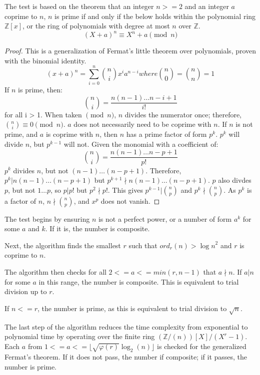 \documentclass{article}
\begin{document}
The test is based on the theorem that an integer $n >= 2$ and an integer $a$ coprime to $n$, $n$ is prime if and only if the below holds within the polynomial ring $\mathbb{Z}[x]$, or the ring of polynomials with degree at most $n$ over $\mathbb{Z}$.
\[
    (X + a)^n \equiv X^n + a \pmod{n}
\]

\begin{proof} %
    This is a generalization of Fermat's little theorem over polynomials, proven with the binomial identity.
    \[
        (x + a)^n = \sum_{i=0}^{n} \binom{n}{i} x^i a^{n - i} where \binom{n}{0} = \binom{n}{n} = 1
    \]
    If $n$ is prime, then:
    \[
        \binom{n}{i} = \frac{n (n - 1) \ldots{} {n - i + 1}}{i!}
    \]
    for all i > 1. When taken $\pmod{n}$, $n$ divides the numerator once; therefore, $\binom{n}{i} \equiv 0 \pmod{n}$. $a$ does not necessarily need to be coprime with $n$.
    If $n$ is not prime, and $a$ is coprime with $n$, then $n$ has a prime factor of form $p^k$. $p^k$ will divide $n$, but $p^{k - 1}$ will not. Given the monomial with a coefficient of:
    \[
        \binom{n}{i} = \frac{n (n - 1) \ldots{} {n - p + 1}}{p!}
    \]
    $p^k$ divides $n$, but not $(n - 1) \ldots{} (n - p + 1)$. Therefore, $p^k \vert n (n - 1) \ldots{} (n - p + 1)$ but $p^{k + 1} \nmid n (n - 1) \ldots{} (n - p + 1)$. $p$ also divdes $p$, but not $1 \ldots p$, so $p \vert p!$ but $p^2 \nmid p!$. This gives $p^{k - 1} \vert \binom{n}{p}$ and $p^k \nmid \binom{n}{p}$. As $p^k$ is a factor of $n$, $n \nmid \binom{n}{p}$, and $x^p$ does not vanish.
\end{proof}

The test begins by ensuring $n$ is not a perfect power, or a number of form $a^k$ for some $a$ and $k$. If it is, the number is composite.

Next, the algorithm finds the smallest $r$ such that $ord_r(n) > {\log{n}}^2$ and $r$ is coprime to $n$.

The algorithm then checks for all $2 <= a <= min(r, n - 1)$ that $a \nmid n$. If $a \vert n$ for some $a$ in this range, the number is composite. This is equivalent to trial division up to $r$.

If $n <= r$, the number is prime, as this is equivalent to trial division to $\sqrt{n}$.

The last step of the algorithm reduces the time complexity from exponential to polynomial time by operating over the finite ring $(\mathbb{Z}/(n))[X] / (X^r - 1)$. Each $a$ from $1 <= a <= \lfloor \sqrt{\varphi(r)}\log_2(n) \rfloor$ is checked for the generalized Fermat's theorem. If it does not pass, the number if composite; if it passes, the number is prime.
\end{document}
